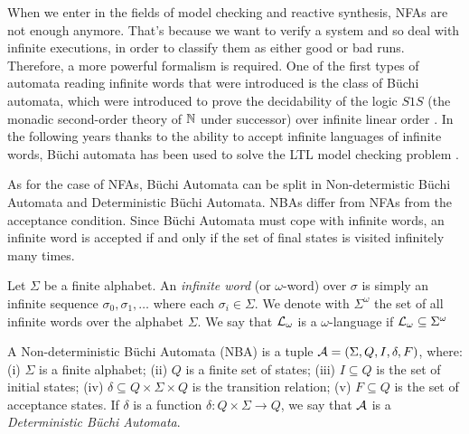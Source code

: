 When we enter in the fields of model checking and reactive synthesis, NFAs are not enough anymore. That's because we want to verify a system and so deal with infinite executions, in order to classify them as either good or bad runs. Therefore, a more powerful formalism is required.
One of the first types of automata reading infinite words that were introduced is the class of B{\"u}chi automata, which were introduced to prove the decidability of the logic $S1S$ (the monadic second-order theory of $\mathbb{N}$ under successor) over infinite linear order \cite{B66}. 
In the following years thanks to the ability to accept infinite languages of infinite words, B{\"u}chi automata has been used to solve the LTL model checking problem \cite{VW86}.

As for the case of NFAs, B{\"u}chi Automata can be split in Non-determistic B{\"u}chi Automata and Deterministic B{\"u}chi Automata. NBAs differ from NFAs from the acceptance condition. Since B{\"u}chi Automata must cope with infinite words, an infinite word is accepted if and only if the set of final states is visited infinitely many times. 

\begin{definition}
Let $\Sigma$ be a finite alphabet. An \textit{infinite word} (or $\omega$-word) over $\sigma$ is simply an infinite sequence $\sigma_0,\sigma_1,\dots$ where each $\sigma_i \in \Sigma$. We denote with $\Sigma^\omega$ the set of all infinite words over the alphabet $\Sigma$.
We say that $\mathcal{L}{}_\omega{}$ is a $\omega$-language if $\mathcal{L}{}_\omega{} \subseteq \Sigma^\omega$
\end{definition}

\begin{definition}
A Non-deterministic B{\"u}chi Automata (NBA) is a tuple $\mathcal{A} = \left( \Sigma,Q,I,\delta,F \right)$, where: (i) $\Sigma$ is a finite alphabet; (ii) $Q$ is a finite set of states; (iii) $I \subseteq Q$ is the set of initial states; (iv) $\delta \subseteq Q \times \Sigma \times Q$ is the transition relation; (v) $F \subseteq Q$ is the set of acceptance states.
If $\delta$ is a function $\delta \colon Q \times \Sigma \to Q$, we say that $\mathcal{A}$ is a \textit{Deterministic B{\"u}chi Automata}.
\end{definition}


